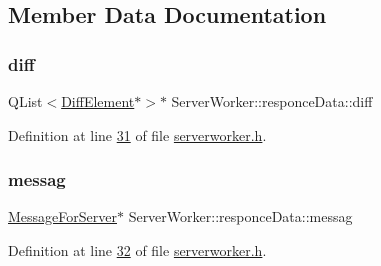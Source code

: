 \subsection{Member Data Documentation}
\mbox{\label{a00189_abcaa9482893ea18f129f3b821e4b4ec8}} 
\subsubsection{\texorpdfstring{diff}{diff}}
{\footnotesize\ttfamily Q\+List$<$\hyperlink{a00141}{Diff\+Element}$\ast$$>$$\ast$ Server\+Worker\+::responce\+Data\+::diff}



Definition at line \hyperlink{a00110_source_l00031}{31} of file \hyperlink{a00110_source}{serverworker.\+h}.

\mbox{\label{a00189_a0915cfbfe5884aecde59303745ced47b}} 
\subsubsection{\texorpdfstring{messag}{messag}}
{\footnotesize\ttfamily \hyperlink{a00121}{Message\+For\+Server}$\ast$ Server\+Worker\+::responce\+Data\+::messag}



Definition at line \hyperlink{a00110_source_l00032}{32} of file \hyperlink{a00110_source}{serverworker.\+h}.


